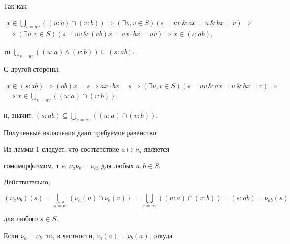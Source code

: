 \begin{pf}


Так как


\begin{multline*}


x\in\bigcup_{s=uv}((u:a)\cap(v:b))\Rightarrow(\exists u,v\in S)(s=uv


\,\&\, ax=u \,\&\, bx=v)\Rightarrow \\


\Rightarrow(\exists u,v\in S)(s=uv\,\&\,(ab)x=ax\cdot


bx=uv)\Rightarrow x\in(s:ab),


\end{multline*}


то $\bigcup\limits_{s=uv}((u:a)\wedge(v:b))\subseteq(s:ab)$.


С другой стороны,


\begin{multline*}


x\in(s:ab)\Rightarrow(ab)x=s\Rightarrow ax\cdot bx=s\Rightarrow(\exists


u,v\in S)(s=uv\,\&\, ax=u\,\&\, bx=v)\Rightarrow \\


\Rightarrow x\in\bigcup_{s=uv}((u:a)\cap (v:b)),


\end{multline*}


и, значит, $(s:ab)\subseteq\bigcup\limits_{s=uv}((u:a)\cap (v:b))$.


Полученные включения дают требуемое равенство.


\end{pf}





Из леммы 1 следует, что соответствие $a\mapsto\nu_a$ является


гомоморфизмом, т.\,е. $\nu_a\nu_b=\nu_{ab}$ для любых $a,b\in S$.


Действительно,


$$


(\nu_a\nu_b)(s)=\bigcup_{s=uv}(\nu_a(u)\cap\nu_b(v))=


\bigcup_{s=uv}((u:a)\cap(v:b))=(s:ab)=\nu_{ab}(s)


$$


для любого $s\in S$.





Если $\nu_a=\nu_b$, то, в частности, $\nu_a(a)=\nu_b(a)$, откуда


